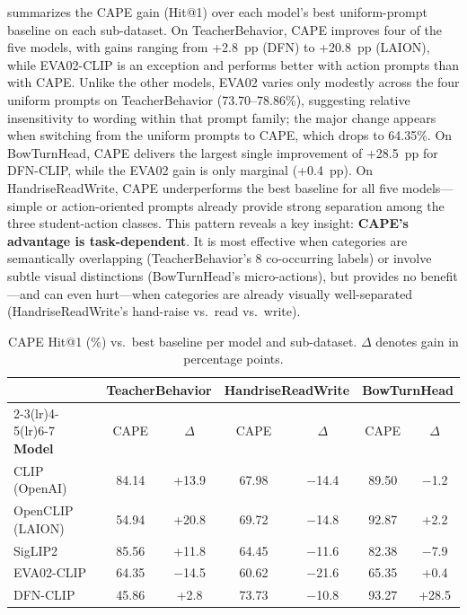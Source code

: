 \documentclass[symmetry,article,submit,pdftex,moreauthors]{Definitions/mdpi}
\begin{document}
 summarizes the CAPE gain (Hit@1) over each model's best uniform-prompt baseline on each sub-dataset.
On TeacherBehavior, CAPE improves four of the five models, with gains ranging from +2.8~pp (DFN) to +20.8~pp (LAION), while EVA02-CLIP is an exception and performs better with action prompts than with CAPE. Unlike the other models, EVA02 varies only modestly across the four uniform prompts on TeacherBehavior (73.70--78.86\%), suggesting relative insensitivity to wording within that prompt family; the major change appears when switching from the uniform prompts to CAPE, which drops to 64.35\%.
On BowTurnHead, CAPE delivers the largest single improvement of +28.5~pp for DFN-CLIP, while the EVA02 gain is only marginal (+0.4~pp).
On HandriseReadWrite, CAPE underperforms the best baseline for all five models---simple or action-oriented prompts already provide strong separation among the three student-action classes.
This pattern reveals a key insight: \textbf{CAPE's advantage is task-dependent}. It is most effective when categories are semantically overlapping (TeacherBehavior's 8 co-occurring labels) or involve subtle visual distinctions (BowTurnHead's micro-actions), but provides no benefit---and can even hurt---when categories are already visually well-separated (HandriseReadWrite's hand-raise vs.\ read vs.\ write).

\begin{table}[H]
\caption{CAPE Hit@1 (\%) vs.\ best baseline per model and sub-dataset. $\Delta$ denotes gain in percentage points.}
\label{tab:cape_gain}
\centering
\small
\setlength{\tabcolsep}{3pt}
\begin{tabular}{l cc cc cc}
\toprule
 & \multicolumn{2}{c}{\textbf{TeacherBehavior}} & \multicolumn{2}{c}{\textbf{HandriseReadWrite}} & \multicolumn{2}{c}{\textbf{BowTurnHead}} \\
\cmidrule(lr){2-3}\cmidrule(lr){4-5}\cmidrule(lr){6-7}
\textbf{Model} & CAPE & $\Delta$ & CAPE & $\Delta$ & CAPE & $\Delta$ \\
\midrule
CLIP (OpenAI) & 84.14 & +13.9 & 67.98 & $-$14.4 & 89.50 & $-$1.2 \\
OpenCLIP (LAION) & 54.94 & +20.8 & 69.72 & $-$14.8 & 92.87 & +2.2 \\
SigLIP2 & 85.56 & +11.8 & 64.45 & $-$11.6 & 82.38 & $-$7.9 \\
EVA02-CLIP & 64.35 & $-$14.5 & 60.62 & $-$21.6 & 65.35 & +0.4 \\
DFN-CLIP & 45.86 & +2.8 & 73.73 & $-$10.8 & 93.27 & +28.5 \\
\bottomrule
\end{tabular}
\end{table}
\end{document}

